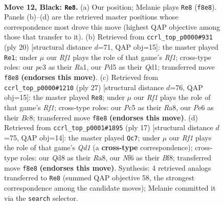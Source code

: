 \documentclass[11pt]{article}
\begin{document}
\clearpage

\begin{figure}[p]\centering
\begin{subfigure}{0.46\textwidth}\centering
\resizebox{\linewidth}{!}{%
\newchessgame
\chessboard[
  setfen={r1bq1rk1/p4ppp/1n2pn2/2pp4/8/2PBPNP1/PP3RPP/RNQ3K1 b - - 3 12},
  showmover=false,
  pgfstyle=straightmove, color=movearrow, markmove={f8-e8}
]}
\caption{}
\end{subfigure}\hfill
\begin{subfigure}{0.46\textwidth}\centering
\resizebox{\linewidth}{!}{%
\newchessgame
\chessboard[
  setfen={r3kbnr/pp1q3p/2n1pp2/3p1p2/3P4/2P2N2/PP3PPP/RNBQ1RK1 w kq - 0 11},
  showmover=false,
  pgfstyle=straightmove, color=movearrow, markmove={f1-e1}
]}
\caption{}
\end{subfigure}
\\[4pt]
\begin{subfigure}{0.46\textwidth}\centering
\resizebox{\linewidth}{!}{%
\newchessgame
\chessboard[
  setfen={r1bq1rk1/pp3ppp/3p1nn1/4p3/1PP5/1Q1P1N2/P3BPPP/R1B1R1K1 b - - 0 14},
  showmover=false,
  pgfstyle=straightmove, color=movearrow, markmove={f8-e8}
]}
\caption{}
\end{subfigure}\hfill
\begin{subfigure}{0.46\textwidth}\centering
\resizebox{\linewidth}{!}{%
\newchessgame
\chessboard[
  setfen={r2qkb1r/pp2pp1p/2n2np1/3p4/3P4/2PQ1N1P/PP3PP1/RNB2RK1 b kq - 0 9},
  showmover=false,
  pgfstyle=straightmove, color=movearrow, markmove={d8-c7}
]}
\caption{}
\end{subfigure}
\caption{\textbf{Move 12, Black: \texttt{Re8}.} (a) Our position; Melanie plays \texttt{Re8} (\texttt{f8e8}). Panels (b)--(d) are the retrieved master positions whose correspondence most drove this move (highest QAP objective among those that transfer to it). (b) Retrieved from \texttt{ccrl\_top\_p0000\#931} (ply 20) [structural distance $d$=71, QAP obj=15]: the master played \texttt{Re1}; under $\mu$ our \emph{Rf1} plays the role of that game's \emph{Rf1}; cross-type roles: our \emph{p}c3 as their \emph{R}a1, our \emph{P}d5 as their \emph{Q}d1; transferred move \texttt{f8e8} \textbf{(endorses this move)}. (c) Retrieved from \texttt{ccrl\_top\_p0000\#1210} (ply 27) [structural distance $d$=76, QAP obj=15]: the master played \texttt{Re8}; under $\mu$ our \emph{Rf1} plays the role of that game's \emph{Rf1}; cross-type roles: our \emph{P}c5 as their \emph{R}a8, our \emph{P}e6 as their \emph{B}c8; transferred move \texttt{f8e8} \textbf{(endorses this move)}. (d) Retrieved from \texttt{ccrl\_top\_p0001\#1895} (ply 17) [structural distance $d$=75, QAP obj=14]: the master played \texttt{Qc7}; under $\mu$ our \emph{Rf1} plays the role of that game's \emph{Qd1} (a \textbf{cross-type} correspondence); cross-type roles: our \emph{Q}d8 as their \emph{R}a8, our \emph{N}f6 as their \emph{B}f8; transferred move \texttt{f8e8} \textbf{(endorses this move)}. Synthesis: 4 retrieved analogs transferred to \texttt{Re8} (summed QAP objective 58, the strongest correspondence among the candidate moves); Melanie committed it via the \texttt{search} selector.}
\label{fig:thought-m23}
\end{figure}
\end{document}
